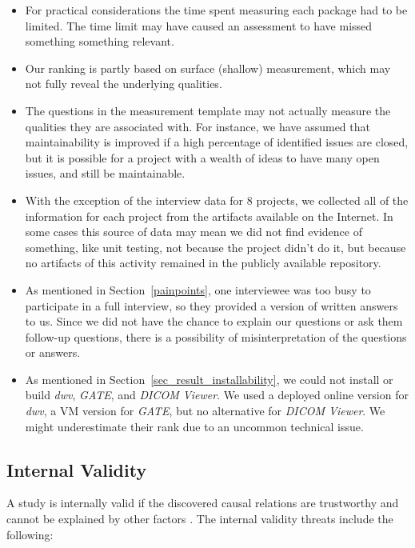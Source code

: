\documentclass[final, 3p, times, authoryear]{elsarticle}
\begin{document}
\begin{itemize}
\item For practical considerations the time spent measuring each package had to
be limited.  The time limit may have caused an assessment to have missed
something something relevant.
\item Our ranking is partly based on surface (shallow) measurement, which may
not fully reveal the underlying qualities.
\item The questions in the measurement template may not actually measure the
qualities they are associated with.  For instance, we have assumed that
maintainability is improved if a high percentage of identified issues are
closed, but it is possible for a project with a wealth of ideas to have many
open issues, and still be maintainable.
\item With the exception of the interview data for 8 projects, we collected all
of the information for each project from the artifacts available on the
Internet. In some cases this source of data may mean we did not find evidence of
something, like unit testing, not because the project didn't do it, but because
no artifacts of this activity remained in the publicly available repository.
\item As mentioned in Section~\ref{painpoints}, one interviewee was too busy
to participate in a full interview, so they provided a version of written answers
to us. Since we did not have the chance to explain our questions or ask them
follow-up questions, there is a possibility of misinterpretation of the
questions or answers.
\item As mentioned in Section~\ref{sec_result_installability}, we could not
install or build \textit{dwv}, \textit{GATE}, and \textit{DICOM Viewer}. We used
a deployed online version for \textit{dwv}, a VM version for \textit{GATE}, but
no alternative for \textit{DICOM Viewer}. We might underestimate their rank due
to an uncommon technical issue.
\end{itemize}

\subsection{Internal Validity} \label{Sec_InternalValidity}

A study is internally valid if the discovered causal relations are trustworthy
and cannot be explained by other factors \citep{RunesonAndHost2009}. The
internal validity threats include the following:
\end{document}
